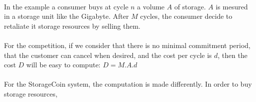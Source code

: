 \documentclass[a4paper,12pt]{article}
\begin{document}
\paragraph*{}
In the example a consumer buys at cycle $n$ a volume $A$ of storage. $A$ is mesured in a storage unit like the Gigabyte. After $M$ cycles, the consumer decide to retaliate it storage resources by selling them.

\paragraph*{}
For the competition, if we consider that there is no minimal commitment period, that the customer can cancel when desired, and the cost per cycle is $d$, then the cost $D$ will be easy to compute: $D=M.A.d$

\paragraph*{}
For the StorageCoin system, the computation is made differently. In order to buy storage resources, 
\end{document}
